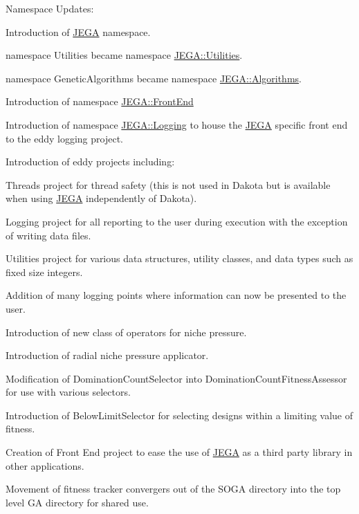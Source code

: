 \begin{DoxyItemize}
\item Namespace Updates\+:
\begin{DoxyItemize}
\item Introduction of \hyperlink{namespaceJEGA}{J\+E\+GA} namespace.
\item namespace Utilities became namespace \hyperlink{namespaceJEGA_1_1Utilities}{J\+E\+G\+A\+::\+Utilities}.
\item namespace Genetic\+Algorithms became namespace \hyperlink{namespaceJEGA_1_1Algorithms}{J\+E\+G\+A\+::\+Algorithms}.
\item Introduction of namespace \hyperlink{namespaceJEGA_1_1FrontEnd}{J\+E\+G\+A\+::\+Front\+End}
\item Introduction of namespace \hyperlink{namespaceJEGA_1_1Logging}{J\+E\+G\+A\+::\+Logging} to house the \hyperlink{namespaceJEGA}{J\+E\+GA} specific front end to the eddy logging project.
\end{DoxyItemize}
\item Introduction of eddy projects including\+:
\begin{DoxyItemize}
\item Threads project for thread safety (this is not used in Dakota but is available when using \hyperlink{namespaceJEGA}{J\+E\+GA} independently of Dakota).
\item Logging project for all reporting to the user during execution with the exception of writing data files.
\item Utilities project for various data structures, utility classes, and data types such as fixed size integers.
\end{DoxyItemize}
\item Addition of many logging points where information can now be presented to the user.
\item Introduction of new class of operators for niche pressure.
\item Introduction of radial niche pressure applicator.
\item Modification of Domination\+Count\+Selector into Domination\+Count\+Fitness\+Assessor for use with various selectors.
\item Introduction of Below\+Limit\+Selector for selecting designs within a limiting value of fitness.
\item Creation of Front End project to ease the use of \hyperlink{namespaceJEGA}{J\+E\+GA} as a third party library in other applications.
\item Movement of fitness tracker convergers out of the S\+O\+GA directory into the top level GA directory for shared use.

\end{DoxyItemize}
